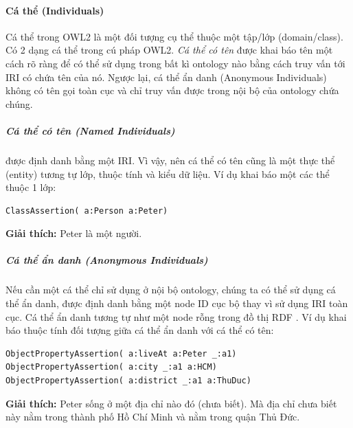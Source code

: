 \paragraph{Cá thể (Individuals)}
Cá thể trong OWL2 là một đối tượng cụ thể thuộc một tập/lớp (domain/class). Có 2 dạng cá thể trong cú pháp OWL2. \textit{Cá thể có tên} được khai báo tên một cách rõ ràng để có thể sử dụng trong bất kì ontology nào bằng cách truy vấn tới IRI có chứa tên của nó. Ngược lại, cá thể ẩn danh (Anonymous Individuals) không có tên gọi toàn cục và chỉ truy vấn được trong nội bộ của ontology chứa chúng.

\subparagraph{Cá thể có tên (Named Individuals)} được định danh bằng một IRI. Vì vậy, nên cá thể có tên cũng là một thực thể (entity) tương tự lớp, thuộc tính và kiểu dữ liệu. Ví dụ khai báo một các thể thuộc 1 lớp:
\begin{verbatim}
ClassAssertion( a:Person a:Peter)
\end{verbatim}
\textbf{Giải thích:} Peter là một người.

\subparagraph{Cá thể ẩn danh (Anonymous Individuals)} Nếu cần một cá thể chỉ sử dụng ở nội bộ ontology, chúng ta có thể sử dụng cá thể ẩn danh, được định danh bằng một node ID cục bộ thay vì sử dụng IRI toàn cục. Cá thể ẩn danh tương tự như một node rỗng trong đồ thị RDF \cite{rdf_concept}. Ví dụ khai báo thuộc tính đối tượng giữa cá thể ẩn danh với cá thể có tên:

\begin{verbatim}
ObjectPropertyAssertion( a:liveAt a:Peter _:a1)
ObjectPropertyAssertion( a:city _:a1 a:HCM)
ObjectPropertyAssertion( a:district _:a1 a:ThuDuc)
\end{verbatim}
\textbf{Giải thích:} Peter sống ở một địa chỉ nào đó (chưa biết). Mà địa chỉ chưa biết này nằm trong thành phố Hồ Chí Minh và nằm trong quận Thủ Đức.

